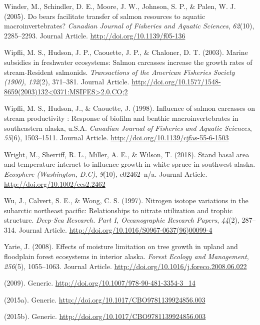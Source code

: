 \documentclass [11pt, proquest] {uwthesis}[2015/03/03]
\begin{document}
\hypertarget{ref-Winder2005}{}
Winder, M., Schindler, D. E., Moore, J. W., Johnson, S. P., \& Palen, W.
J. (2005). Do bears facilitate transfer of salmon resources to aquatic
macroinvertebrates? \emph{Canadian Journal of Fisheries and Aquatic
Sciences}, \emph{62}(10), 2285--2293. Journal Article.
\url{http://doi.org/10.1139/f05-136}

\hypertarget{ref-Wipfli2003}{}
Wipfli, M. S., Hudson, J. P., Caouette, J. P., \& Chaloner, D. T.
(2003). Marine subsidies in freshwater ecosystems: Salmon carcasses
increase the growth rates of stream‐Resident salmonids.
\emph{Transactions of the American Fisheries Society (1900)},
\emph{132}(2), 371--381. Journal Article.
\href{http://doi.org/10.1577/1548-8659(2003)132\%3C0371:MSIFES\%3E2.0.CO;2}{http://doi.org/10.1577/1548-8659(2003)132\textless{}0371:MSIFES\textgreater{}2.0.CO;2}

\hypertarget{ref-Wipfli1998}{}
Wipfli, M. S., Hudson, J., \& Caouette, J. (1998). Influence of salmon
carcasses on stream productivity : Response of biofilm and benthic
macroinvertebrates in southeastern alaska, u.S.A. \emph{Canadian Journal
of Fisheries and Aquatic Sciences}, \emph{55}(6), 1503--1511. Journal
Article. \url{http://doi.org/10.1139/cjfas-55-6-1503}

\hypertarget{ref-Wright2018}{}
Wright, M., Sherriff, R. L., Miller, A. E., \& Wilson, T. (2018). Stand
basal area and temperature interact to influence growth in white spruce
in southwest alaska. \emph{Ecosphere (Washington, D.C)}, \emph{9}(10),
e02462--n/a. Journal Article. \url{http://doi.org/10.1002/ecs2.2462}

\hypertarget{ref-Wu1997}{}
Wu, J., Calvert, S. E., \& Wong, C. S. (1997). Nitrogen isotope
variations in the subarctic northeast pacific: Relationships to nitrate
utilization and trophic structure. \emph{Deep-Sea Research. Part I,
Oceanographic Research Papers}, \emph{44}(2), 287--314. Journal Article.
\url{http://doi.org/10.1016/S0967-0637(96)00099-4}

\hypertarget{ref-Yarie2008}{}
Yarie, J. (2008). Effects of moisture limitation on tree growth in
upland and floodplain forest ecosystems in interior alaska. \emph{Forest
Ecology and Management}, \emph{256}(5), 1055--1063. Journal Article.
\url{http://doi.org/10.1016/j.foreco.2008.06.022}

\hypertarget{ref-Graham2010}{}
(2009). Generic. \url{http://doi.org/10.1007/978-90-481-3354-3_14}

\hypertarget{ref-Du2015}{}
(2015a). Generic. \url{http://doi.org/10.1017/CBO9781139924856.003}

\hypertarget{ref-Frank2015}{}
(2015b). Generic. \url{http://doi.org/10.1017/CBO9781139924856.003}
\end{document}
